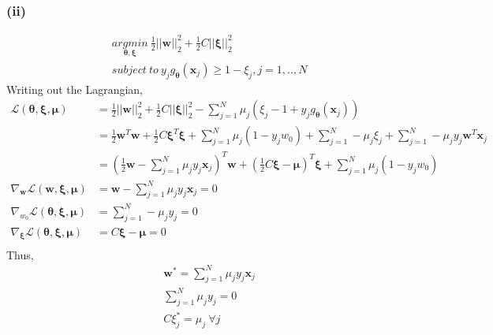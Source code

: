 \documentclass[11pt]{article}
\begin{document}
\subsubsection*{(ii)}
\begin{equation}
\begin{split}
&\underset{\pmb{\theta},\pmb{\xi}}{argmin}\ \frac{1}{2}||\pmb{w}||^2_2 + \frac{1}{2}C||\pmb{\xi}||^2_2\\
&subject\ to\ y_jg_{\pmb{\theta}}(\pmb{x}_j)\ge 1-\xi_j,j=1,..,N
\end{split}
\end{equation}
Writing out the Lagrangian, 
\begin{equation}
\begin{split}
\mathcal{L}(\pmb{\theta}, \pmb{\xi}, \pmb{\mu}) &= \frac{1}{2}||\pmb{w}||^2_2 + \frac{1}{2}C||\pmb{\xi}||^2_2 - \sum_{j=1}^{N}\mu_j(\xi_j-1+y_jg_{\pmb{\theta}}(\pmb{x}_j))\\
&=\frac{1}{2}\pmb{w}^T\pmb{w} + \frac{1}{2}C\pmb{\xi}^T\pmb{\xi} + \sum_{j=1}^{N}\mu_j(1-y_jw_0) + \sum_{j=1}^{N}-\mu_j\xi_j + \sum_{j=1}^{N}-\mu_jy_j\pmb{w}^T\pmb{x}_j\\
&=(\frac{1}{2}\pmb{w}-\sum_{j=1}^{N}\mu_jy_j\pmb{x}_j)^T\pmb{w} + (\frac{1}{2}C\pmb{\xi}-\pmb{\mu})^T\pmb{\xi} + \sum_{j=1}^{N}\mu_j(1-y_jw_0)\\
\nabla_{\pmb{w}}\mathcal{L}(\pmb{w}, \pmb{\xi}, \pmb{\mu}) &= \pmb{w}-\sum_{j=1}^{N}\mu_jy_j\pmb{x}_j = 0\\
\nabla_{w_0}\mathcal{L}(\pmb{\theta}, \pmb{\xi}, \pmb{\mu}) &=\sum_{j=1}^{N}-\mu_j y_j=0\\
\nabla_{\pmb{\xi}}\mathcal{L}(\pmb{\theta}, \pmb{\xi}, \pmb{\mu}) &= C\pmb{\xi}-\pmb{\mu} = 0\\
\end{split}
\end{equation}
Thus,
\begin{equation}
\begin{split}
&\pmb{w}^*=\sum_{j=1}^{N}\mu_jy_j\pmb{x}_j\\
&\sum_{j=1}^{N}\mu_jy_j = 0\\
&C\xi_j^*= \mu_j\ \forall j\\
\end{split}
\end{equation}
\end{document}
